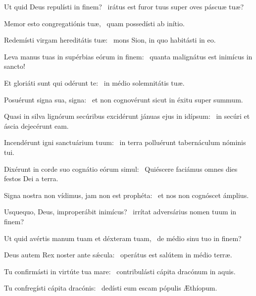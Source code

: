 \item Ut quid Deus repulísti in finem?~\psstar{} irátus est furor tuus super oves páscuæ tuæ?

\item Memor esto congregatiónis tuæ,~\psstar{} quam possedísti ab inítio.

\item Redemísti virgam hereditátis tuæ:~\psstar{} mons Sion, in quo habitásti in eo.

\item Leva manus tuas in supérbias eórum in finem:~\psstar{} quanta malignátus est inimícus in sancto!

\item Et gloriáti sunt qui odérunt te:~\psstar{} in médio solemnitátis tuæ.

\item Posuérunt signa sua, signa:~\psstar{} et non cognovérunt sicut in éxitu super summum.

\item Quasi in silva lignórum secúribus excidérunt jánuas ejus in idípsum:~\psstar{} in secúri et áscia dejecérunt eam.

\item Incendérunt igni sanctuárium tuum:~\psstar{} in terra polluérunt tabernáculum nóminis tui.

\item Dixérunt in corde suo cognátio eórum simul:~\psstar{} Quiéscere faciámus omnes dies festos Dei a terra.

\item Signa nostra non vídimus, jam non est prophéta:~\psstar{} et nos non cognóscet ámplius.

\item Usquequo, Deus, improperábit inimícus?~\psstar{} irrítat adversárius nomen tuum in finem?

\item Ut quid avértis manum tuam et déxteram tuam,~\psstar{} de médio sinu tuo in finem?

\item Deus autem Rex noster ante sǽcula:~\psstar{} operátus est salútem in médio terræ.

\item Tu confirmásti in virtúte tua mare:~\psstar{} contribulásti cápita dracónum in aquis.

\item Tu confregísti cápita dra\-có\-nis:~\psstar{} dedísti eum escam pópulis Æthíopum.

